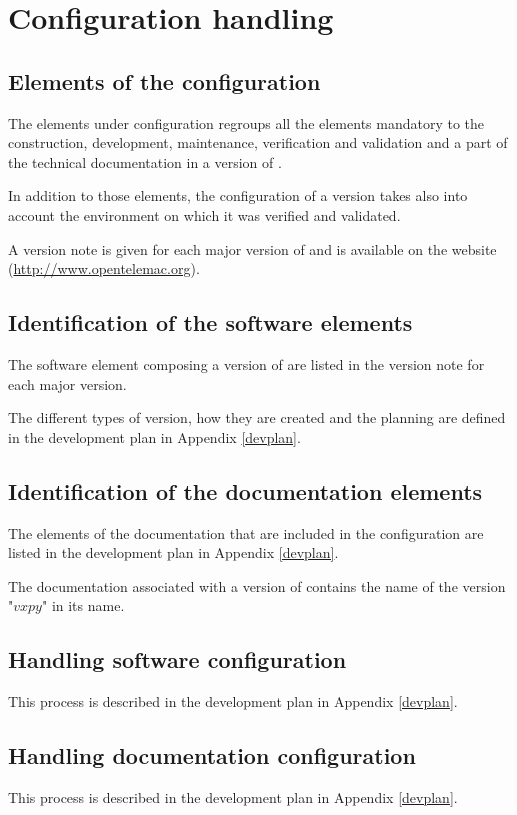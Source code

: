 \chapter{Configuration handling}

\section{Elements of the configuration}

The elements under configuration regroups all the elements mandatory to the
construction, development, maintenance, verification and validation and a part
of the technical documentation in a version of \telemacsystem.

In addition to those elements, the configuration of a version takes also into account
the environment on which it was verified and validated.

A version note is given for each major version of \telemacsystem and is available on
the website (\url{http://www.opentelemac.org}).

\section{Identification of the software elements}

The software element composing a version of \telemacsystem are listed in the version
note for each major version.

The different types of version, how they are created and the planning are
defined in the development plan in Appendix \ref{devplan}.

\section{Identification of the documentation elements}

The elements of the documentation that are included in the configuration are
listed in the development plan in Appendix \ref{devplan}.

The documentation associated with a version of \telemacsystem contains the name of the
version "$vxpy$" in its name.

\section{Handling software configuration}

This process is described in the development plan in Appendix \ref{devplan}.

\section{Handling documentation configuration}

This process is described in the development plan in Appendix \ref{devplan}.

